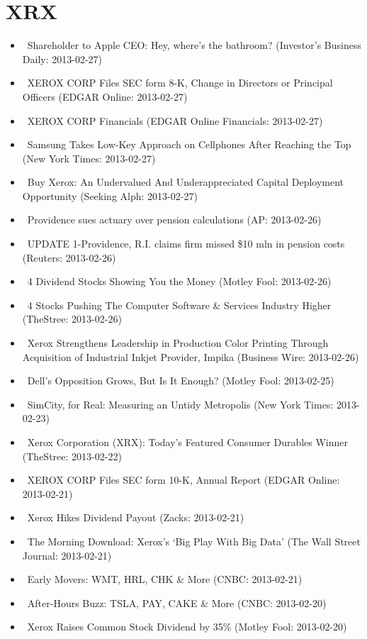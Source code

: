 \documentclass[11pt,asymmetric]{article}
\begin{document}
\section*{XRX}
\begin{itemize}
\item\ Shareholder to Apple CEO: Hey, where's the bathroom? (Investor's Business Daily: 2013-02-27)
\item\ XEROX CORP Files SEC form 8-K, Change in Directors or Principal Officers (EDGAR Online: 2013-02-27)
\item\ XEROX CORP Financials (EDGAR Online Financials: 2013-02-27)
\item\ Samsung Takes Low-Key Approach on Cellphones After Reaching the Top (New York Times: 2013-02-27)
\item\ Buy Xerox: An Undervalued And Underappreciated Capital Deployment Opportunity (Seeking Alph: 2013-02-27)
\item\ Providence sues actuary over pension calculations (AP: 2013-02-26)
\item\ UPDATE 1-Providence, R.I. claims firm missed \$10 mln in pension costs (Reuters: 2013-02-26)
\item\ 4 Dividend Stocks Showing You the Money (Motley Fool: 2013-02-26)
\item\ 4 Stocks Pushing The Computer Software \& Services Industry Higher (TheStree: 2013-02-26)
\item\ Xerox Strengthens Leadership in Production Color Printing Through Acquisition of Industrial Inkjet Provider, Impika (Business Wire: 2013-02-26)
\item\ Dell's Opposition Grows, But Is It Enough? (Motley Fool: 2013-02-25)
\item\ SimCity, for Real: Measuring an Untidy Metropolis (New York Times: 2013-02-23)
\item\ Xerox Corporation (XRX): Today's Featured Consumer Durables Winner (TheStree: 2013-02-22)
\item\ XEROX CORP Files SEC form 10-K, Annual Report (EDGAR Online: 2013-02-21)
\item\ Xerox Hikes Dividend Payout (Zacks: 2013-02-21)
\item\ The Morning Download: Xerox's `Big Play With Big Data' (The Wall Street Journal: 2013-02-21)
\item\ Early Movers: WMT, HRL, CHK \& More (CNBC: 2013-02-21)
\item\ After-Hours Buzz: TSLA, PAY, CAKE \& More (CNBC: 2013-02-20)
\item\ Xerox Raises Common Stock Dividend by 35\% (Motley Fool: 2013-02-20)

\end{itemize}
\end{document}

